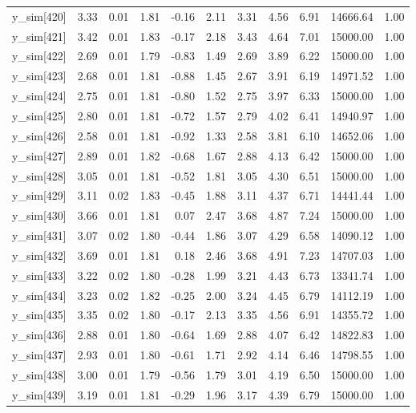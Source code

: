 \begin{table}[ht]
\begin{tabular}{rrrrrrrrrrr}
  y\_sim[420] & 3.33 & 0.01 & 1.81 & -0.16 & 2.11 & 3.31 & 4.56 & 6.91 & 14666.64 & 1.00 \\ 
  y\_sim[421] & 3.42 & 0.01 & 1.83 & -0.17 & 2.18 & 3.43 & 4.64 & 7.01 & 15000.00 & 1.00 \\ 
  y\_sim[422] & 2.69 & 0.01 & 1.79 & -0.83 & 1.49 & 2.69 & 3.89 & 6.22 & 15000.00 & 1.00 \\ 
  y\_sim[423] & 2.68 & 0.01 & 1.81 & -0.88 & 1.45 & 2.67 & 3.91 & 6.19 & 14971.52 & 1.00 \\ 
  y\_sim[424] & 2.75 & 0.01 & 1.81 & -0.80 & 1.52 & 2.75 & 3.97 & 6.33 & 15000.00 & 1.00 \\ 
  y\_sim[425] & 2.80 & 0.01 & 1.81 & -0.72 & 1.57 & 2.79 & 4.02 & 6.41 & 14940.97 & 1.00 \\ 
  y\_sim[426] & 2.58 & 0.01 & 1.81 & -0.92 & 1.33 & 2.58 & 3.81 & 6.10 & 14652.06 & 1.00 \\ 
  y\_sim[427] & 2.89 & 0.01 & 1.82 & -0.68 & 1.67 & 2.88 & 4.13 & 6.42 & 15000.00 & 1.00 \\ 
  y\_sim[428] & 3.05 & 0.01 & 1.81 & -0.52 & 1.81 & 3.05 & 4.30 & 6.51 & 15000.00 & 1.00 \\ 
  y\_sim[429] & 3.11 & 0.02 & 1.83 & -0.45 & 1.88 & 3.11 & 4.37 & 6.71 & 14441.44 & 1.00 \\ 
  y\_sim[430] & 3.66 & 0.01 & 1.81 & 0.07 & 2.47 & 3.68 & 4.87 & 7.24 & 15000.00 & 1.00 \\ 
  y\_sim[431] & 3.07 & 0.02 & 1.80 & -0.44 & 1.86 & 3.07 & 4.29 & 6.58 & 14090.12 & 1.00 \\ 
  y\_sim[432] & 3.69 & 0.01 & 1.81 & 0.18 & 2.46 & 3.68 & 4.91 & 7.23 & 14707.03 & 1.00 \\ 
  y\_sim[433] & 3.22 & 0.02 & 1.80 & -0.28 & 1.99 & 3.21 & 4.43 & 6.73 & 13341.74 & 1.00 \\ 
  y\_sim[434] & 3.23 & 0.02 & 1.82 & -0.25 & 2.00 & 3.24 & 4.45 & 6.79 & 14112.19 & 1.00 \\ 
  y\_sim[435] & 3.35 & 0.02 & 1.80 & -0.17 & 2.13 & 3.35 & 4.56 & 6.91 & 14355.72 & 1.00 \\ 
  y\_sim[436] & 2.88 & 0.01 & 1.80 & -0.64 & 1.69 & 2.88 & 4.07 & 6.42 & 14822.83 & 1.00 \\ 
  y\_sim[437] & 2.93 & 0.01 & 1.80 & -0.61 & 1.71 & 2.92 & 4.14 & 6.46 & 14798.55 & 1.00 \\ 
  y\_sim[438] & 3.00 & 0.01 & 1.79 & -0.56 & 1.79 & 3.01 & 4.19 & 6.50 & 15000.00 & 1.00 \\ 
  y\_sim[439] & 3.19 & 0.01 & 1.81 & -0.29 & 1.96 & 3.17 & 4.39 & 6.79 & 15000.00 & 1.00 \\ 

\end{tabular}
\end{table}
